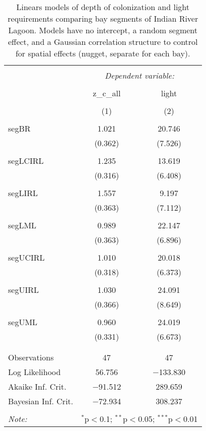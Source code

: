 \documentclass[letterpaper,12pt]{article}\usepackage[]{graphicx}\usepackage[]{color}
\begin{document}
\begin{table}[!htbp] \centering 
  \caption{Linears models of depth of colonization and light requirements comparing bay segments of Indian River Lagoon.  Models have no intercept, a random segment effect, and a Gaussian correlation structure to control for spatial effects (nugget, separate for each bay).} 
  \label{} 
\begin{tabular}{@{\extracolsep{5pt}}lcc} 
\\[-1.8ex]\hline 
\hline \\[-1.8ex] 
 & \multicolumn{2}{c}{\textit{Dependent variable:}} \\ 
\cline{2-3} 
\\[-1.8ex] & z\_c\_all & light \\ 
\\[-1.8ex] & (1) & (2)\\ 
\hline \\[-1.8ex] 
 segBR & 1.021 & 20.746 \\ 
  & (0.362) & (7.526) \\ 
  & & \\ 
 segLCIRL & 1.235 & 13.619 \\ 
  & (0.316) & (6.408) \\ 
  & & \\ 
 segLIRL & 1.557 & 9.197 \\ 
  & (0.363) & (7.112) \\ 
  & & \\ 
 segLML & 0.989 & 22.147 \\ 
  & (0.363) & (6.896) \\ 
  & & \\ 
 segUCIRL & 1.010 & 20.018 \\ 
  & (0.318) & (6.373) \\ 
  & & \\ 
 segUIRL & 1.030 & 24.091 \\ 
  & (0.366) & (8.649) \\ 
  & & \\ 
 segUML & 0.960 & 24.019 \\ 
  & (0.331) & (6.673) \\ 
  & & \\ 
\hline \\[-1.8ex] 
Observations & 47 & 47 \\ 
Log Likelihood & 56.756 & $-$133.830 \\ 
Akaike Inf. Crit. & $-$91.512 & 289.659 \\ 
Bayesian Inf. Crit. & $-$72.934 & 308.237 \\ 
\hline 
\hline \\[-1.8ex] 
\textit{Note:}  & \multicolumn{2}{r}{$^{*}$p$<$0.1; $^{**}$p$<$0.05; $^{***}$p$<$0.01} \\ 
\end{tabular} 
\end{table} 
\end{document}

